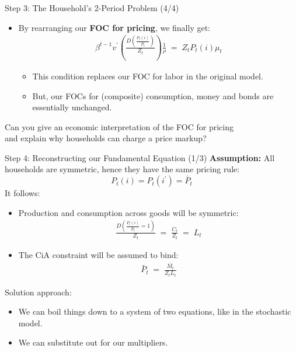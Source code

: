\documentclass[10pt,c,aspectratio=1610,handout]{beamer}
\begin{document}
\begin{frame}{Step 3: The Household's 2-Period Problem (4/4)}%
  \begin{itemize}%
    \item[$\blacktriangleright$] By rearranging our \textbf{FOC for pricing}, we finally get:%
    \begin{align}%
      \beta^{t-1} v^{\prime} \left( \frac{D\left( \frac{P_{t}(i)}{\bar{P}_{t}} \right)}{Z_{t}} \right) \frac{1}{\rho} \; = \; Z_{t} P_{t}(i) \mu _{t}\label{mark-up pricing good k}%
    \end{align}%
    \begin{itemize}%
      \item[$\rightarrow$] This condition replaces our FOC for labor in the original model.%
      \item[$\rightarrow$] But, our FOCs for (composite) consumption, money and bonds are essentially unchanged.%
    \end{itemize}%
  \end{itemize}%
  \vspace*{0.3in}%
  \begin{center}%
    \begin{large}%
      Can you give an economic interpretation of the FOC for pricing\\and explain why households can charge a price markup?%
    \end{large}%
  \end{center}%
\end{frame}%
\begin{frame}{Step 4: Reconstructing our Fundamental Equation (1/3)}%
  \textbf{Assumption:} All households are symmetric, hence they have the same pricing rule:%
  $$P_{t}(i) = P_{t}(i^{\prime}) = \bar{P}_{t}$$%
  It follows:%
  \pause%
  \begin{itemize}%
    \item[$\blacktriangleright$] Production and consumption across goods will be symmetric:%
    \begin{align*}%
      \frac{D\left( \frac{P_{t}(i)}{\bar{P}_{t}} = 1 \right)}{Z_{t}} \; = \; \frac{C_t}{Z_t} \; = \; L_{t}%
    \end{align*}%
    \pause%
    \item[$\blacktriangleright$] The CiA constraint will be assumed to bind:%
    \begin{align*}%
      \bar P_t \; = \; \frac{\bar{M_t}}{Z_t L_t}%
    \end{align*}%
  \end{itemize}%
  \pause%
  Solution approach:%
  \begin{itemize}%
    \item[$\blacktriangleright$] We can boil things down to a system of two equations, like in the stochastic model.%
    \item[$\blacktriangleright$] We can substitute out for our multipliers.%
  \end{itemize}%
\end{frame}%
\end{document}
